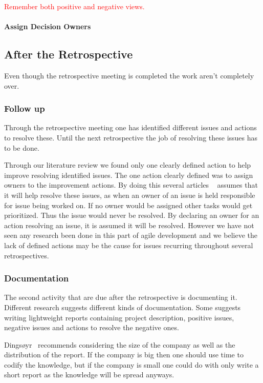 \documentclass[12pt]{article}
\newcommand\todo[1]{\textcolor{red}{#1}}
\begin{document}
\todo{Remember both positive and negative views.}

\paragraph{Assign Decision Owners} \label{par:assign-decision-owners}

\subsection{After the Retrospective}
Even though the retrospective meeting is completed the work aren't completely over. 

\subsubsection{Follow up}
Through the retrospective meeting one has identified different issues and actions to resolve these. Until the next retrospective the job of resolving these issues has to be done. 

Through our literature review we found only one clearly defined action to help improve resolving identified issues. The one action clearly defined was to assign owners to the improvement actions. By doing this several articles ~\cite{Collier1996,Drury2012} assumes that it will help resolve these issues, as when an owner of an issue is held responsible for issue being worked on. If no owner would be assigned other tasks would get prioritized. Thus the issue would never be resolved. By declaring an owner for an action resolving an issue, it is assumed it will be resolved. However we have not seen any research been done in this part of agile development and we believe the lack of defined actions may be the cause for issues recurring throughout several retrospectives. 

\subsubsection{Documentation}
The second activity that are due after the retrospective is documenting it. Different research suggests different kinds of documentation. Some suggests ~\cite{Collier1996} writing lightweight reports containing project description, positive issues, negative issues and actions to resolve the negative ones. 

Dingsøyr~\cite{Dingsoyr2005} recommends considering the size of the company as well as the distribution of the report. If the company is big then one should use time to codify the knowledge, but if the company is small one could do with only write a short report as the knowledge will be spread anyways. 
\end{document}
